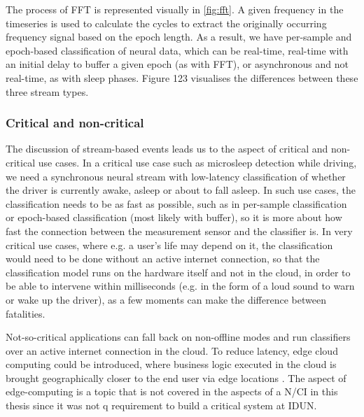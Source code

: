 The process of FFT is represented visually in \autoref{fig:fft}. A given frequency in the timeseries is used to calculate the cycles to extract the originally occurring frequency signal based on the epoch length. As a result, we have per-sample and epoch-based classification of neural data, which can be real-time, real-time with an initial delay to buffer a given epoch (as with FFT), or asynchronous and not real-time, as with sleep phases. Figure 123 visualises the differences between these three stream types.


\subsubsection{Critical and non-critical}
\label{chapter5-critical-and-non-critical}

The discussion of stream-based events leads us to the aspect of critical and non-critical use cases. In a critical use case such as microsleep detection while driving, we need a synchronous neural stream with low-latency classification of whether the driver is currently awake, asleep or about to fall asleep. In such use cases, the classification needs to be as fast as possible, such as in per-sample classification or epoch-based classification (most likely with buffer), so it is more about how fast the connection between the measurement sensor and the classifier is. In very critical use cases, where e.g. a user's life may depend on it, the classification would need to be done without an active internet connection, so that the classification model runs on the hardware itself and not in the cloud, in order to be able to intervene within milliseconds (e.g. in the form of a loud sound to warn or wake up the driver), as a few moments can make the difference between fatalities.

Not-so-critical applications can fall back on non-offline modes and run classifiers over an active internet connection in the cloud. To reduce latency, edge cloud computing could be introduced, where business logic executed in the cloud is brought geographically closer to the end user via edge locations \citep{nomios_what_nodate}. The aspect of edge-computing is a topic that is not covered in the aspects of a N/CI in this thesis since it was not q requirement to build a critical system at IDUN.


